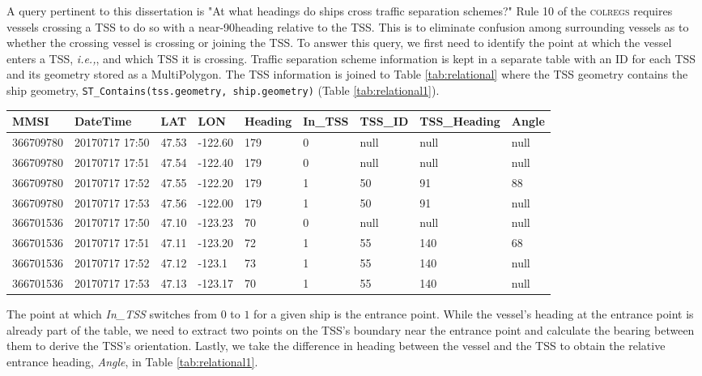 \documentclass[twoside,symmetric,notoc]{tufte-book}
\newcommand{\hairsp}{\hspace{1pt}}
\newcommand{\ie}{\textit{i.\hairsp{}e.,}\hspace{3pt}}
\begin{document}
\par{%
A query pertinent to this dissertation is "At what headings do ships cross traffic separation schemes?" Rule 10 of the \textsc{colregs} requires vessels crossing a TSS to do so with a near-90\textdegree heading relative to the TSS. This is to eliminate confusion among surrounding vessels as to whether the crossing vessel is crossing or joining the TSS. To answer this query, we first need to identify the point at which the vessel enters a TSS, \ie{the entrance point}, and which TSS it is crossing. Traffic separation scheme information is kept in a separate table with an ID for each TSS and its geometry stored as a MultiPolygon. The TSS information is joined to Table \ref{tab:relational} where the TSS geometry contains the ship geometry, \texttt{ST_Contains(tss.geometry, ship.geometry)} (Table \ref{tab:relational1}).
\begin{table*}
    \centering
    \begin{tabular}{l l l l l  l l l l}
    \hline
     MMSI       & DateTime   & LAT   & LON         & Heading   & In\_TSS & TSS\_ID &TSS\_Heading & Angle\\
     \hline
     \hline
     366709780  & 20170717 17:50 & 47.53  & -122.60      & 179 & 0 & null & null    & null\\
     366709780	& 20170717 17:51 & 47.54  & -122.40      & 179 & 0 & null & null    & null\\
     \rowcolor{Gray}
     366709780	& 20170717 17:52 & 47.55  & -122.20      & 179 & 1 & 50   & 91      & 88\\
     366709780	& 20170717 17:53 & 47.56  & -122.00      & 179 & 1 & 50   & 91      & null\\
     366701536  & 20170717 17:50 & 47.10  & -123.23      & 70  & 0 & null & null    & null\\
     \rowcolor{Gray}
     366701536	& 20170717 17:51 & 47.11  & -123.20      & 72  & 1 & 55   & 140     & 68\\
     366701536	& 20170717 17:52 & 47.12  & -123.1       & 73  & 1 & 55   & 140     & null\\
     366701536	& 20170717 17:53 & 47.13  & -123.17      & 70  & 1 & 55   & 140     & null\\
     \hline
    \end{tabular}
    \vspace{0.2in}
    \caption{Example trajectory point data with TSS information.}
    \label{tab:relational1}
\end{table*}
The point at which \textit{In\_TSS} switches from $0$ to $1$ for a given ship is the entrance point. While the vessel's heading at the entrance point is already part of the table, we need to extract two points on the TSS's boundary near the entrance point and calculate the bearing between them to derive the TSS's orientation. Lastly, we take the difference in heading between the vessel and the TSS to obtain the relative entrance heading, \textit{Angle}, in Table \ref{tab:relational1}.
}
\end{document}
